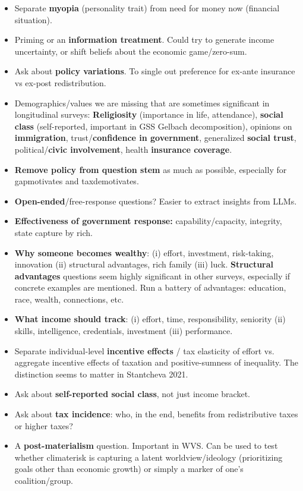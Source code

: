 \documentclass{article}
\begin{document}
\begin{itemize}
    \item Separate \textbf{myopia} (personality trait) from need for money now (financial situation).
    \item Priming or an \textbf{information treatment}. Could try to generate income uncertainty, or shift beliefs about the economic game/zero-sum.
    \item Ask about \textbf{policy variations}. To single out preference for ex-ante insurance vs ex-post redistribution. 
    \item Demographics/values we are missing that are sometimes significant in longitudinal surveys: \textbf{Religiosity} (importance in life, attendance), \textbf{social class} (self-reported, important in GSS Gelbach decomposition), opinions on \textbf{immigration}, trust/\textbf{confidence in government}, generalized \textbf{social trust}, political/\textbf{civic involvement}, health \textbf{insurance coverage}.
    \item \textbf{Remove policy from question stem} as much as possible, especially for gapmotivates and taxdemotivates.
    \item \textbf{Open-ended}/free-response questions? Easier to extract insights from LLMs.
    \item \textbf{Effectiveness of government response:} capability/capacity, integrity, state capture by rich. 
    \item \textbf{Why someone becomes wealthy}:  (i) effort, investment, risk-taking, innovation (ii) structural advantages, rich family (iii) luck. \textbf{Structural advantages} questions seem highly significant in other surveys, especially if concrete examples are mentioned. Run a battery of advantages: education, race, wealth, connections, etc.
    \item \textbf{What income should track}: (i) effort, time, responsibility, seniority (ii) skills, intelligence, credentials, investment (iii) performance.
    \item Separate individual-level \textbf{incentive effects} / tax elasticity of effort vs. aggregate incentive effects of taxation and positive-sumness of inequality. The distinction seems to matter in Stantcheva 2021.
    \item Ask about \textbf{self-reported social class}, not just income bracket.
    \item Ask about \textbf{tax incidence}: who, in the end, benefits from redistributive taxes or higher taxes?
    \item A \textbf{post-materialism} question. Important in WVS. Can be used to test whether climaterisk is capturing a latent worldview/ideology (prioritizing goals other than economic growth) or simply a marker of one's coalition/group. 

\end{itemize}
\end{document}
